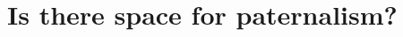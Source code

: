 \documentclass[oneside,11pt]{article}
\begin{document}




\section{Is there space for paternalism?}
\label{exploring}
\end{document}
